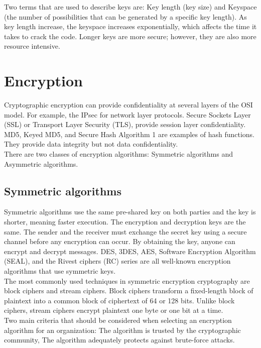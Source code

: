 Two terms that are used to describe keys are: Key length (key size) and Keyspace (the number of possibilities that can be generated by a specific key length). As key length increase, the keyspace increases exponentially, which affects the time it takes to crack the code. Longer keys are more secure; however, they are also more resource intensive.

\section{Encryption}

Cryptographic encryption can provide confidentiality at several layers of the OSI model. For example, the IPsec for network layer protocols. Secure Sockets Layer (SSL) or Transport Layer Security (TLS), provide session layer confidentiality. MD5, Keyed MD5, and Secure Hash Algorithm 1 are examples of hash functions. They provide data integrity but not data confidentiality.\\

There are two classes of encryption algorithms: Symmetric algorithms and Asymmetric algorithms.

\subsection{Symmetric algorithms}

Symmetric algorithms use the same pre-shared key on both parties and the key is shorter, meaning faster execution. The encryption and decryption keys are the same. The sender and the receiver must exchange the secret key using a secure channel before any encryption can occur. By obtaining the key, anyone can encrypt and decrypt messages. DES, 3DES, AES, Software Encryption Algorithm (SEAL), and the Rivest ciphers (RC) series are all well-known encryption algorithms that use symmetric keys.\\

The most commonly used techniques in symmetric encryption cryptography are block ciphers and stream ciphers. Block ciphers transform a fixed-length block of plaintext into a common block of ciphertext of 64 or 128 bits. Unlike block ciphers, stream ciphers encrypt plaintext one byte or one bit at a time.\\

Two main criteria that should be considered when selecting an encryption algorithm for an organization: The algorithm is trusted by the cryptographic community, The algorithm adequately protects against brute-force attacks.\\

